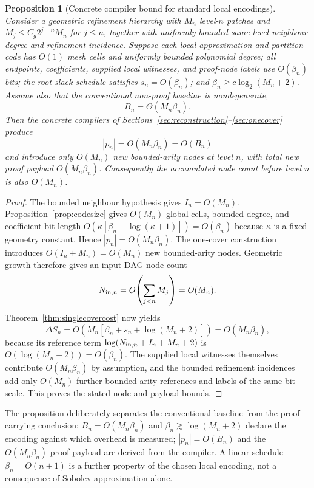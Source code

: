 \documentclass[11pt]{article}
\newtheorem{proposition}[theorem]{Proposition}
\theoremstyle{definition}
\begin{document}
\begin{proposition}[Concrete compiler bound for standard local encodings]\label{prop:H6compiler}
Consider a geometric refinement hierarchy with $M_n$ level-$n$ patches and
$M_j\le C_g2^{j-n}M_n$ for $j\le n$, together with uniformly bounded same-level
neighbour degree and refinement incidence.  Suppose each local approximation and partition
code has $O(1)$ mesh cells and uniformly bounded polynomial degree; all endpoints,
coefficients, supplied local witnesses, and proof-node labels use $O(\beta_n)$ bits;
the root-slack schedule satisfies $s_n=O(\beta_n)$; and
$\beta_n\ge c\log_2(M_n+2)$.  Assume also that the conventional non-proof baseline is
nondegenerate,
\[
 B_n=\Theta(M_n\beta_n).
\]
Then the concrete compilers of Sections~\ref{sec:reconstruction}--\ref{sec:onecover}
produce
\[
 |p_n|=O(M_n\beta_n)=O(B_n)
\]
and introduce only $O(M_n)$ new bounded-arity nodes at level $n$, with total new proof
payload $O(M_n\beta_n)$.  Consequently the accumulated node count before level $n$ is
also $O(M_n)$.
\end{proposition}

\begin{proof}
The bounded neighbour hypothesis gives $I_n=O(M_n)$.  Proposition~\ref{prop:codesize}
gives $O(M_n)$ global cells, bounded degree, and coefficient bit length
$O(\kappa[\beta_n+\log(\kappa+1)])=O(\beta_n)$ because $\kappa$ is a fixed geometry
constant.  Hence $|p_n|=O(M_n\beta_n)$.  The one-cover construction introduces
$O(I_n+M_n)=O(M_n)$ new bounded-arity nodes.  Geometric growth therefore gives an input
DAG node count
\[
 N_{{\rm in},n}=O\!\left(\sum_{j<n}M_j\right)=O(M_n).
\]
Theorem~\ref{thm:singlecovercost} now yields
\[
 \Delta S_n
 =O\!\left(M_n[\beta_n+s_n+\log(M_n+2)]\right)
 =O(M_n\beta_n),
\]
because its reference term
$\log(N_{{\rm in},n}+I_n+M_n+2)$ is $O(\log(M_n+2))=O(\beta_n)$.
The supplied local witnesses themselves contribute $O(M_n\beta_n)$ by assumption, and
the bounded refinement incidences add only $O(M_n)$ further bounded-arity references and
labels of the same bit scale.  This proves the stated node and payload bounds.
\end{proof}

The proposition deliberately separates the conventional baseline from the proof-carrying
conclusion: $B_n=\Theta(M_n\beta_n)$ and
$\beta_n\gtrsim\log(M_n+2)$ declare the encoding against which overhead is measured;
$|p_n|=O(B_n)$ and the $O(M_n\beta_n)$ proof payload are derived from the compiler.
A linear schedule $\beta_n=O(n+1)$ is a further property of the chosen local encoding,
not a consequence of Sobolev approximation alone.
\end{document}
